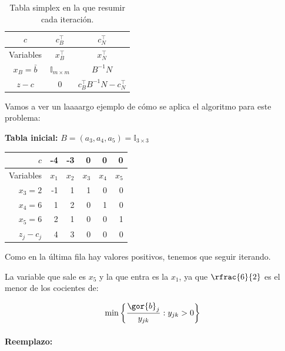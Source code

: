 \begin{table}
\centering
\begin{tabular}{c||c|c}
$c$ & $c_B^\top$  & $c^\top_N$ \\ \hline\hline
Variables & $x_B^\top$ &  $x^\top_N$ \\ \hline
$x_B=\bar{b}$ &    $\mathbb{I}_{m\times m}$ & $B^{-1}N$ \\ \hline
$z-c$   & $0$   & $c_B^\top B^{-1}N - c^\top_N$
\end{tabular}
\label{tbl:simplex}
\caption{Tabla simplex en la que resumir cada iteración.}
\end{table}


\begin{example}

Vamos a ver un laaaargo ejemplo de cómo se aplica el algoritmo para este problema:

\begin{ioprob}
\end{ioprob}


\textbf{Tabla inicial:}  $B=(a_3,a_4,a_5) = \mathbb{I}_{3\times 3}$



\begin{table}
\centering
\begin{tabular}{r | rrrrr}
$c$ & -4 & -3 & 0 & 0 & 0 \\ \hline
Variables & $x_1$ & $x_2$ & $x_3$ & $x_4$ & $x_5$ \\ \hline
$x_3 = 2$ & -1 & 1 & 1 & 0 & 0 \\
$x_4=6$   & 1 & 2 & 0 & 1 & 0  \\
$x_5=6$ & 2 & 1 & 0 & 0 & 1 \\ \hline
$z_j-c_j$ & 4 & 3 & 0 & 0 & 0 
\end{tabular}
\end{table}

Como en la última fila hay valores positivos, tenemos que seguir iterando. 

La variable que sale es $x_5$ y la que entra es la $x_1$, ya que $\rfrac{6}{2}$ es el menor de los cocientes de:

\[\min\left\{\frac{\gor{b}_j}{y_{jk}}: y_{jk}>0\right\}\]

\paragraph{Reemplazo:}


\end{example}
